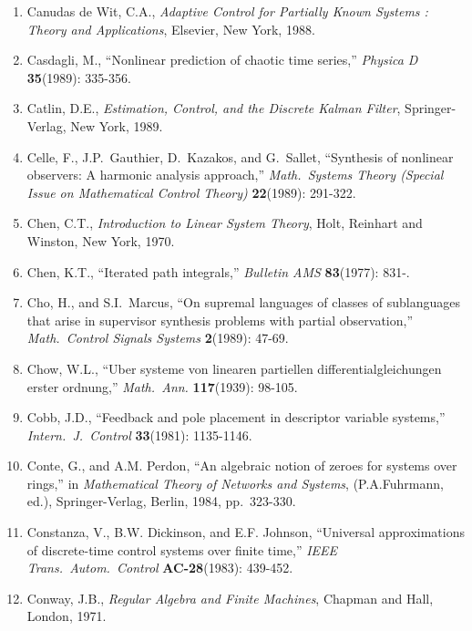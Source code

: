 \begin{enumerate}
\item
Canudas de Wit, C.A., {\it Adaptive Control for Partially Known Systems :
Theory and Applications}, Elsevier, New York, 1988.

\item
Casdagli, M., ``Nonlinear prediction of chaotic time series,'' {\it Physica D}
{\bf 35}(1989): 335-356.

\item
Catlin, D.E., {\it Estimation, Control, and the Discrete Kalman Filter},
Springer-Verlag, New York, 1989.

\item
Celle, F., J.P.\ Gauthier, D.\ Kazakos, and G.\ Sallet, ``Synthesis of
nonlinear observers: A harmonic analysis approach,'' {\it Math.\ Systems
Theory (Special Issue on Mathematical Control Theory)} {\bf 22}(1989):
291-322.

\item
Chen, C.T., {\it Introduction to Linear System Theory}, Holt, Reinhart and
Winston, New York, 1970.

\item
Chen, K.T., ``Iterated path integrals,'' {\it Bulletin AMS} {\bf 83}(1977):
831-.

\item
Cho, H., and S.I.\ Marcus, ``On supremal languages of classes of sublanguages
that arise in supervisor synthesis problems with partial observation,'' {\it
Math.\ Control Signals Systems} {\bf 2}(1989): 47-69.

\item
Chow, W.L., ``Uber systeme von linearen partiellen differentialgleichungen
erster ordnung,'' {\it Math.~Ann.} {\bf 117}(1939): 98-105.

\item
Cobb, J.D., ``Feedback and pole placement in descriptor variable systems,''
{\it Intern.\ J.\ Control} {\bf 33}(1981): 1135-1146.

\item
Conte, G., and A.M. Perdon, ``An algebraic notion of zeroes for systems over
rings,'' in {\it Mathematical Theory of Networks and Systems}, (P.A.Fuhrmann,
ed.), Springer-Verlag, Berlin, 1984, pp.\ 323-330.

\item
Constanza, V., B.W. Dickinson, and E.F. Johnson, ``Universal approximations of
discrete-time control systems over finite time,'' {\it IEEE Trans.\ Autom.\
Control} {\bf AC-28}(1983): 439-452.

\item
Conway, J.B., {\it Regular Algebra and Finite Machines}, Chapman and Hall,
London, 1971.


\end{enumerate}
